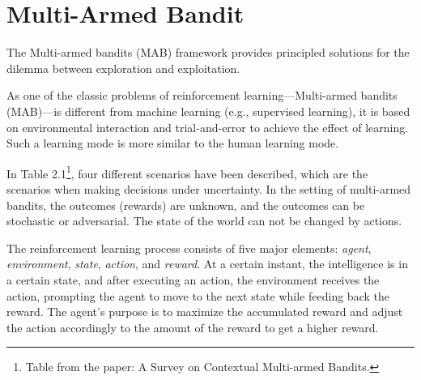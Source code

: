 \section{Multi-Armed Bandit}
The Multi-armed bandits (MAB) framework provides principled solutions for the dilemma between exploration and exploitation.

As one of the classic problems of reinforcement learning—Multi-armed bandits (MAB)—is different from machine learning (e.g., supervised learning), it is based on environmental interaction and trial-and-error to achieve the effect of learning. Such a learning mode is more similar to the human learning mode.


\begin{table}[htbp]
\centering
 
\caption{Four scenarios when making decisions under uncertainty}     

\end{table}

In Table 2.1\footnote[2]{Table from the paper: A Survey on Contextual Multi-armed Bandits.}, four different scenarios have been described, which are the scenarios when making decisions under uncertainty. In the setting of multi-armed bandits, the outcomes (rewards) are unknown, and the outcomes can be stochastic or adversarial. The state of the world can not be changed by actions.

The reinforcement learning process consists of five major elements:  \textit{agent}, \textit{environment}, \textit{state}, \textit{action}, and \textit{reward}. At a certain instant, the intelligence is in a certain state, and after executing an action, the environment receives the action, prompting the agent to move to the next state while feeding back the reward. The agent's purpose is to maximize the accumulated reward and adjust the action accordingly to the amount of the reward to get a higher reward.

